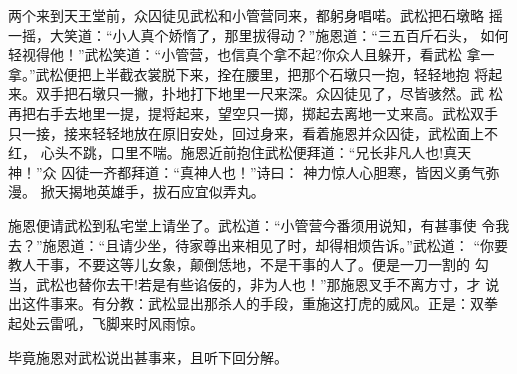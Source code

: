 两个来到天王堂前，众囚徒见武松和小管营同来，都躬身唱喏。武松把石墩略
摇一摇，大笑道：“小人真个娇惰了，那里拔得动？”施恩道：“三五百斤石头，
如何轻视得他！”武松笑道：“小管营，也信真个拿不起?你众人且躲开，看武松
拿一拿。”武松便把上半截衣裳脱下来，拴在腰里，把那个石墩只一抱，轻轻地抱
将起来。双手把石墩只一撇，扑地打下地里一尺来深。众囚徒见了，尽皆骇然。武
松再把右手去地里一提，提将起来，望空只一掷，掷起去离地一丈来高。武松双手
只一接，接来轻轻地放在原旧安处，回过身来，看着施恩并众囚徒，武松面上不红，
心头不跳，口里不喘。施恩近前抱住武松便拜道：“兄长非凡人也!真天神！”众
囚徒一齐都拜道：“真神人也！”诗曰：
神力惊人心胆寒，皆因义勇气弥漫。
掀天揭地英雄手，拔石应宜似弄丸。

施恩便请武松到私宅堂上请坐了。武松道：“小管营今番须用说知，有甚事使
令我去？”施恩道：“且请少坐，待家尊出来相见了时，却得相烦告诉。”武松道：
“你要教人干事，不要这等儿女象，颠倒恁地，不是干事的人了。便是一刀一割的
勾当，武松也替你去干!若是有些谄佞的，非为人也！”那施恩叉手不离方寸，才
说出这件事来。有分教：武松显出那杀人的手段，重施这打虎的威风。正是：双拳
起处云雷吼，飞脚来时风雨惊。

毕竟施恩对武松说出甚事来，且听下回分解。